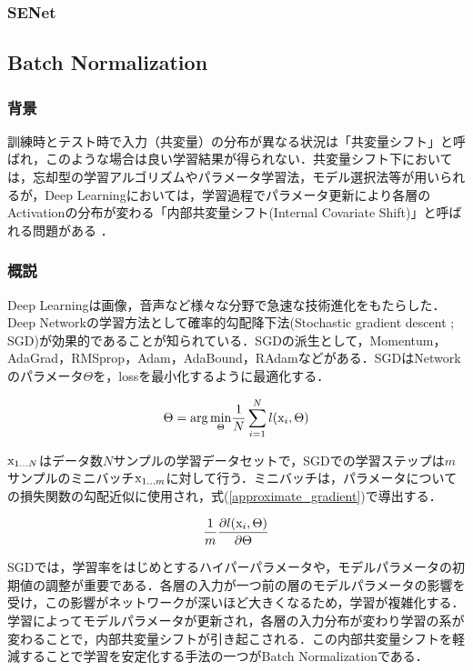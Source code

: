 \documentclass[11pt,a4paper]{jsarticle}
\begin{document}
\subsubsection{SENet}

\subsection{Batch Normalization}

\subsubsection{背景}
訓練時とテスト時で入力（共変量）の分布が異なる状況は「共変量シフト」と呼ばれ，このような場合は良い学習結果が得られない．共変量シフト下においては，忘却型の学習アルゴリズムやパラメータ学習法，モデル選択法等が用いられる\cite{cov_shift}が，Deep Learningにおいては，学習過程でパラメータ更新により各層のActivationの分布が変わる「内部共変量シフト(Internal Covariate Shift)」と呼ばれる問題がある\cite{bn_abs} \cite{bn_google}．

\subsubsection{概説}
Deep Learningは画像，音声など様々な分野で急速な技術進化をもたらした．Deep Networkの学習方法として確率的勾配降下法(Stochastic gradient descent ; SGD)が効果的であることが知られている\cite{sgd_overview}．SGDの派生として，Momentum，AdaGrad，RMSprop，Adam，AdaBound，RAdamなどがある．SGDはNetworkのパラメータ$\Theta$を，lossを最小化するように最適化する．

\begin{equation}
	\Theta = {\rm arg}\,\underset{\Theta}{\rm min}\frac{1}{N}\sum_{i=1}^{N}l({\rm x}_i, \Theta)
\end{equation}

${\rm x}_{1...N}$はデータ数$N$サンプルの学習データセットで，SGDでの学習ステップは$m$サンプルのミニバッチ${\rm x}_{1...m}$に対して行う．ミニバッチは，パラメータについての損失関数の勾配近似に使用され，式(\ref{approximate_gradient})で導出する．

\begin{equation}
\label{approximate_gradient}
	\frac{1}{m}\frac{\partial l({\rm x}_i, \Theta)}{\partial \Theta}
\end{equation}

SGDでは，学習率をはじめとするハイパーパラメータや，モデルパラメータの初期値の調整が重要である．各層の入力が一つ前の層のモデルパラメータの影響を受け，この影響がネットワークが深いほど大きくなるため，学習が複雑化する．学習によってモデルパラメータが更新され，各層の入力分布が変わり学習の系が変わることで，内部共変量シフトが引き起こされる．この内部共変量シフトを軽減することで学習を安定化する手法の一つがBatch Normalizationである．
\end{document}
